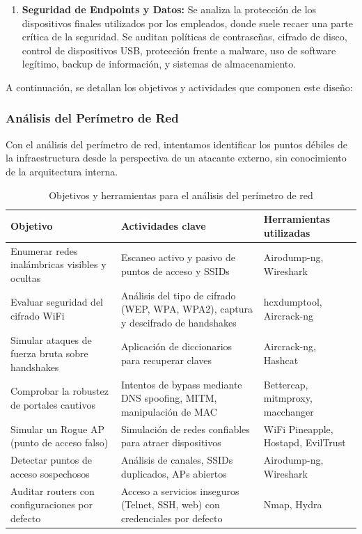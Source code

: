 \documentclass[a4paper, 11pt]{article}
\begin{document}
\begin{enumerate}
\item \textbf{Seguridad de Endpoints y Datos:} Se analiza la protección de los dispositivos finales utilizados por los empleados, donde suele recaer una parte crítica de la seguridad. Se auditan políticas de contraseñas, cifrado de disco, control de dispositivos USB, protección frente a malware, uso de software legítimo, backup de información, y sistemas de almacenamiento.

\end{enumerate}

A continuación, se detallan los objetivos y actividades que componen este diseño:

\subsubsection{Análisis del Perímetro de Red}

Con el análisis del perímetro de red, intentamos identificar los puntos débiles de la infraestructura desde la perspectiva de un atacante externo, sin conocimiento de la arquitectura interna.

\begin{table}[H]
\centering
\renewcommand{\arraystretch}{1.4}
\begin{tabular}{|p{4.3cm}|p{7cm}|p{3.8cm}|}
\hline
\textbf{Objetivo} & \textbf{Actividades clave} & \textbf{Herramientas utilizadas} \\
\hline
Enumerar redes inalámbricas visibles y ocultas & Escaneo activo y pasivo de puntos de acceso y SSIDs & Airodump-ng, Wireshark \\
\hline
Evaluar seguridad del cifrado WiFi & Análisis del tipo de cifrado (WEP, WPA, WPA2), captura y descifrado de handshakes & hcxdumptool, Aircrack-ng \\
\hline
Simular ataques de fuerza bruta sobre handshakes & Aplicación de diccionarios para recuperar claves & Aircrack-ng, Hashcat \\
\hline
Comprobar la robustez de portales cautivos & Intentos de bypass mediante DNS spoofing, MITM, manipulación de MAC & Bettercap, mitmproxy, macchanger \\
\hline
Simular un Rogue AP (punto de acceso falso) & Simulación de redes confiables para atraer dispositivos & WiFi Pineapple, Hostapd, EvilTrust \\
\hline
Detectar puntos de acceso sospechosos & Análisis de canales, SSIDs duplicados, APs abiertos & Airodump-ng, Wireshark \\
\hline
Auditar routers con configuraciones por defecto & Acceso a servicios inseguros (Telnet, SSH, web) con credenciales por defecto & Nmap, Hydra \\
\hline
\end{tabular}
\caption{Objetivos y herramientas para el análisis del perímetro de red}
\label{tab:perimetro_red}
\end{table}
\end{document}
